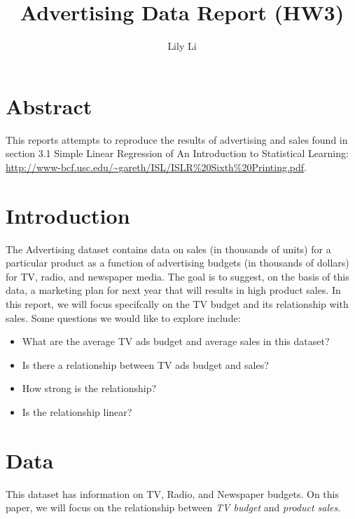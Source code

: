 \documentclass{article}
\begin{document}

\begin{Schunk}
\end{Schunk}

\title{Advertising Data Report (HW3)}

\author{Lily Li}

\section{Abstract}

This reports attempts to reproduce the results of advertising and sales found in section 3.1 Simple Linear Regression of An Introduction to Statistical Learning: \url{http://www-bcf.usc.edu/~gareth/ISL/ISLR%20Sixth%20Printing.pdf}.


\section{Introduction}

The Advertising dataset contains data on sales (in thousands of units) for a particular product as a function of advertising budgets (in thousands of dollars) for TV, radio, and newspaper media. The goal is to suggest, on the basis of this data, a marketing plan for next year that will results in high product sales. In this report, we will focus specifcally on the TV budget and its relationship with sales. Some questions we would like to explore include:

\begin{itemize}
\item What are the average TV ads budget and average sales in this dataset?
\item Is there a relationship between TV ads budget and sales?
\item How strong is the relationship?
\item Is the relationship linear?  
\end{itemize}


\section{Data}

This dataset has information on TV, Radio, and Newspaper budgets. On this paper, we will focus on the relationship between \emph{TV budget} and \emph{product sales}.  
\end{document}
